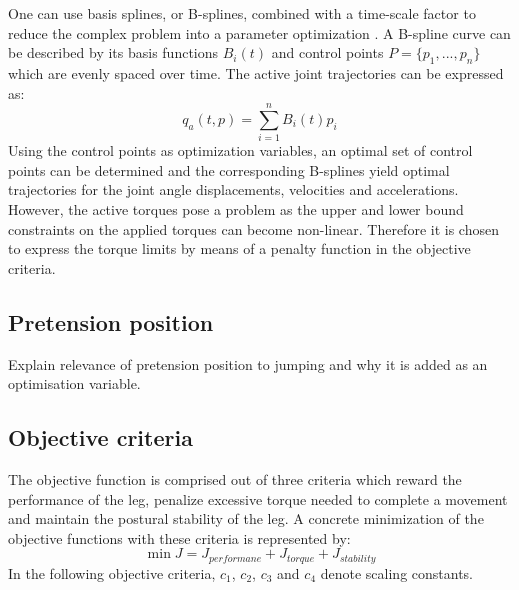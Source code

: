 \documentclass[letterpaper, 10 pt, conference]{ieeeconf}  %
\begin{document}
One can use basis splines, or B-splines, combined with a time-scale factor to reduce the complex problem into a parameter optimization \cite{ude2000planning} \cite{babivc2009biarticulated} \cite{wang1999weight} \cite{albro2001optimal}. A B-spline curve can be described by its basis functions $B_i(t)$ and control points $P=\{p_1,...,p_n\}$ which are evenly spaced over time. The active joint trajectories can be expressed as:   
 \begin{equation}
q_a(t,p) = \sum_{i=1}^{n} B_i (t) p_i
\end{equation}
Using the control points as optimization variables, an optimal set of control points can be determined and the corresponding B-splines yield optimal trajectories for the joint angle displacements, velocities and accelerations. However, the active torques pose a problem as the upper and lower bound constraints on the applied torques can become non-linear. Therefore it is chosen to express the torque limits by means of a penalty function in the objective criteria.

\subsection{Pretension position}

Explain relevance of pretension position to jumping and why it is added as an optimisation variable.

\subsection{Objective criteria}

The objective function is comprised out of three criteria which reward the performance of the leg, penalize excessive torque needed to complete a movement and maintain the postural stability of the leg. A concrete minimization of the objective functions with these criteria is represented by:   
 \begin{equation}
\min\limits J =  J_{performane}+ J_{torque}+ J_{stability}
 \end{equation}
In the following objective criteria, $c_1$, $c_2$, $c_3$ and $c_4$ denote scaling constants.\\
\end{document}

